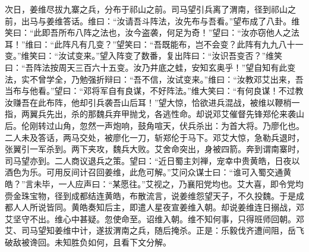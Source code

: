 次日，姜维尽拔九寨之兵，分布于祁山之前。司马望引兵离了渭南，径到祁山之前，出马与姜维答话。维曰：“汝请吾斗阵法，汝先布与吾看。”望布成了八卦。维笑曰：“此即吾所布八阵之法也，汝今盗袭，何足为奇！”望曰：“汝亦窃他人之法耳！”维曰：“此阵凡有几变？”望笑曰：“吾既能布，岂不会变？此阵有九九八十一变。”维笑曰：“汝试变来。”望入阵变了数番，复出阵曰：“汝识吾变否？”维笑曰：“吾阵法按周天三百六十五变。汝乃井底之蛙，安知玄奥乎！”望自知有此变法，实不曾学全，乃勉强折辩曰：“吾不信，汝试变来。”维曰：“汝教邓艾出来，吾当布与他看。”望曰：“邓将军自有良谋，不好阵法。”维大笑曰：“有何良谋！不过教汝赚吾在此布阵，他却引兵袭吾山后耳！”望大惊，恰欲进兵混战，被维以鞭梢一指，两翼兵先出，杀的那魏兵弃甲抛戈，各逃性命。却说邓艾催督先锋郑伦来袭山后。伦刚转过山角，忽然一声炮响，鼓角喧天，伏兵杀出：为首大将。乃廖化也。二人未及答话，两马交处，被廖化一刀，斩郑伦于马下。邓艾大惊，急勒兵退时，张翼引一军杀到。两下夹攻，魏兵大败。艾舍命突出，身被四箭。奔到谓南寨时，司马望亦到。二人商议退兵之策。望曰：“近日蜀主刘禅，宠幸中贵黄皓，日夜以酒色为乐。可用反间计召回姜维，此危可解。”艾问众谋士曰：“谁可入蜀交通黄皓？”言未毕，一人应声曰：“某愿往。”艾视之，乃襄阳党均也。艾大喜，即令党均赍金珠宝物，径到成都结连黄皓，布散流言，说姜维怨望天子，不久投魏。于是成都人人所说皆同。黄皓奏知后主，即遣人星夜宣姜维入朝。却说姜维连日搦战，邓艾坚守不出。维心中甚疑。忽使命至。诏维入朝。维不知何事，只得班师回朝。邓艾、司马望知姜维中计，遂拔渭南之兵，随后掩杀。正是：乐毅伐齐遭间阻，岳飞破敌被谗回。未知胜负如何，且看下文分解。